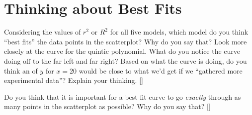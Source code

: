 \vfill 
\section*{Thinking about Best Fits}

\myProblemsWithContent
{
    Considering the values of $r^2$ or $R^2$ for all five models, 
    which model do you think ``best fits'' the data points in the scatterplot?
    Why do you say that?
}
{
    Look more closely at the curve for the quintic polynomial.
    What do you notice the curve doing off to the far left and far right?
    Based on what the curve is doing, do you think an  of $y$ for 
    $x=20$ would be close to what we'd get if we ``gathered more experimental data''?
    Explain your thinking.
    \vspace{10\onelineskip}
}[\small]

\myWideProblemWithContent
{
    Do you think that it is important for a best fit curve to go {\itshape exactly} 
    through as many points in the scatterplot as possible? 
    Why do you say that?
    \vspace{5\onelineskip}
}[\small]
\vfill